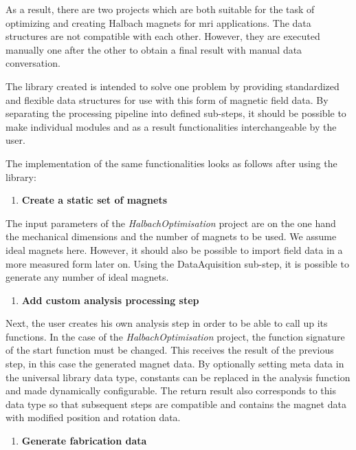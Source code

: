 As a result, there are two projects which are both suitable for the task
of optimizing and creating Halbach magnets for \gls{mri} applications.
The data structures are not compatible with each other. However, they
are executed manually one after the other to obtain a final result with
manual data conversation.

The library created is intended to solve one problem by providing
standardized and flexible data structures for use with this form of
magnetic field data. By separating the processing pipeline into defined
sub-steps, it should be possible to make individual modules and as a
result functionalities interchangeable by the user.

The implementation of the same functionalities looks as follows after
using the library:

\begin{enumerate}
\def\labelenumi{\arabic{enumi}.}
\tightlist
\item
  \textbf{Create a static set of magnets}
\end{enumerate}

The input parameters of the \emph{HalbachOptimisation}
\cite{HalbachOptimisation} project are on the one hand the
mechanical dimensions and the number of magnets to be used. We assume
ideal magnets here. However, it should also be possible to import field
data in a more measured form later on. Using the DataAquisition
sub-step, it is possible to generate any number of ideal magnets.

\begin{enumerate}
\def\labelenumi{\arabic{enumi}.}
\setcounter{enumi}{1}
\tightlist
\item
  \textbf{Add custom analysis processing step}
\end{enumerate}

Next, the user creates his own analysis step in order to be able to call
up its functions. In the case of the \emph{HalbachOptimisation}
\cite{HalbachOptimisation} project, the function signature of the
start function must be changed. This receives the result of the previous
step, in this case the generated magnet data. By optionally setting meta
data in the universal library data type, constants can be replaced in
the analysis function and made dynamically configurable. The return
result also corresponds to this data type so that subsequent steps are
compatible and contains the magnet data with modified position and
rotation data.

\begin{enumerate}
\def\labelenumi{\arabic{enumi}.}
\setcounter{enumi}{2}
\tightlist
\item
  \textbf{Generate fabrication data}
\end{enumerate}

